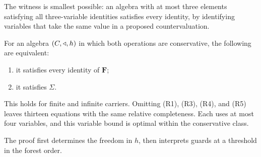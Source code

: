 The witness is smallest possible: an algebra with at most three elements
satisfying all three-variable identities satisfies every identity, by
identifying variables that take the same value in a proposed countervaluation.

\begin{theorem}\label{owner:thm:conservative-basis}
For an algebra $(C,\mathbin{\triangleleft},h)$ in which both operations are conservative,
the following are equivalent:
\begin{enumerate}
\item it satisfies every identity of $\mathbf F$;
\item it satisfies $\Sigma$.
\end{enumerate}
This holds for finite and infinite carriers. Omitting (R1), (R3),
(R4), and (R5) leaves thirteen equations with the same relative
completeness. Each uses at most four variables, and this variable
bound is optimal within the conservative class.
\end{theorem}

The proof first determines the freedom in $h$, then interprets guards
at a threshold in the forest order.

